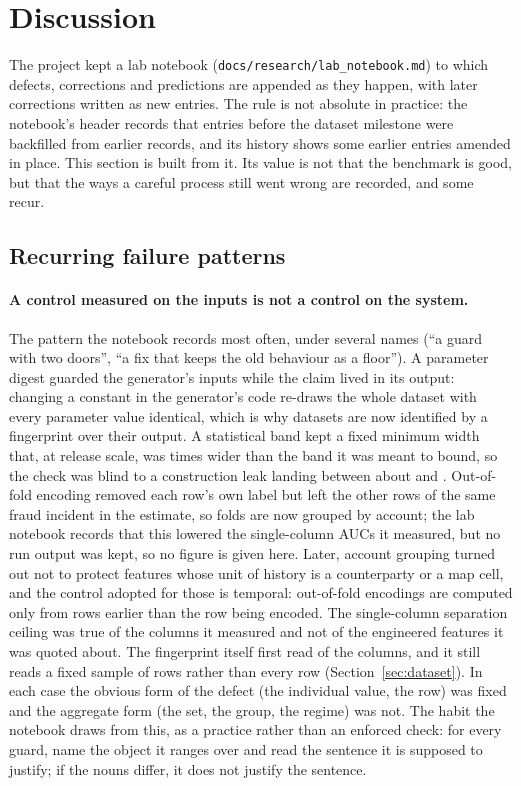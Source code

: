 \section{Discussion}
\label{sec:discussion}

The project kept a lab notebook (\texttt{docs/research/lab\_notebook.md}) to which defects,
corrections and predictions are appended as they happen, with later corrections written as new
entries. The rule is not absolute in practice: the notebook's header records that entries before the
dataset milestone were backfilled from earlier records, and its history shows some earlier entries
amended in place. This section is built from it. Its value is not that the benchmark is good, but
that the ways a careful process still went wrong are recorded, and some recur.

\subsection{Recurring failure patterns}

\paragraph{A control measured on the inputs is not a control on the system.} The pattern the
notebook records most often, under several names (``a guard with two doors'', ``a fix that keeps the
old behaviour as a floor''). A parameter digest guarded the generator's inputs while the claim lived
in its output: changing a constant in the generator's code re-draws the whole dataset with every
parameter value identical, which is why datasets are now identified by a fingerprint over their
output. A statistical band kept a fixed minimum width that, at release scale, was \nBandWider{} times wider
than the band it was meant to bound, so the check was blind to a construction leak landing between
about \nBandBlindLow{} and \nBandBlindHigh{}. Out-of-fold encoding removed each row's own label but
left the other rows of the same fraud incident in the estimate, so folds are now grouped by account;
the lab notebook records that this lowered the single-column AUCs it measured, but no run output was
kept, so no figure is given here. Later, account grouping turned out not
to protect features whose unit of history is a counterparty or a map cell, and the control adopted
for those is temporal: out-of-fold encodings are computed only from rows earlier than the row being
encoded. The single-column separation ceiling was true of the columns it measured and not of the
engineered features it was quoted about. The fingerprint itself first read \nFingerprintColsRead{}
of the \nFingerprintColsTotal{} columns, and it still reads a fixed sample of rows rather than every
row (Section~\ref{sec:dataset}). In each case the obvious form of the defect (the individual value,
the row) was fixed and the aggregate form (the set, the group, the regime) was not. The habit the
notebook draws from this, as a practice rather than an enforced check: for every guard, name the
object it ranges over and read the sentence it is supposed to justify; if the nouns differ, it does
not justify the sentence.

